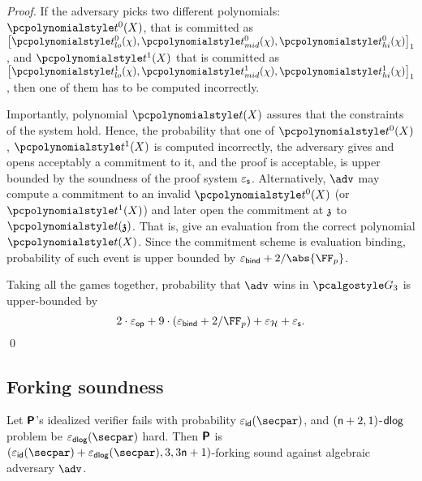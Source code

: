 \begin{proof}
  If the adversary picks two different polynomials: $\p{t^0}(X)$, that is committed
  as $\gone{\p{t^0_{lo}}(\chi), \p{t^0_{mid}}(\chi), \p{t^0_{hi}}(\chi)}$, and
  $\p{t^1}(X)$ that is committed as
  $\gone{\p{t^1_{lo}}(\chi), \p{t^1_{mid}}(\chi), \p{t^1_{hi}}(\chi)}$, then one of
  them has to be computed incorrectly. 

  Importantly, polynomial $\p{t}(X)$ assures that the constraints of the system
  hold. Hence, the probability that one of $\p{t^0}(X)$, $\p{t^1}(X)$ is computed
  incorrectly, the adversary gives and opens acceptably a commitment to it, and
  the proof is acceptable, is upper bounded by the soundness of the proof system
  $\varepsilon_{\mathsf{s}}$. Alternatively, $\adv$ may compute a commitment to an invalid
  $\p{t^0}(X)$ (or $\p{t^1}(X)$) and later open the commitment at $\mathfrak{z}$ to
  $\p{t}(\chz)$. That is, give an evaluation from the correct polynomial
  $\p{t}(X)$. Since the commitment scheme is evaluation binding, probability of
  such event is upper bounded by $\epsbinding + \infrac{2}{\abs{\FF_p}}$.

   Taking all the games together, probability that $\adv$ wins
  in $\game{3}$ is upper-bounded by
  \[
    2 \cdot \epsop + 9 \cdot (\epsbind + \infrac{2}{\FF_p}) + \epsro + \epss.
  \]
  \qed
\end{proof}

\subsection{Forking soundness}
\begin{lemma}
	\label{lem:plonkprot_ss}
	Let $\bm{\mathsf{P}}$'s idealized verifier fails with probability $\epsid (\secpar)$, and
	$(\mathsf{n} + 2, 1)$-$\mathsf{dlog}$ problem be $\epsdlog (\secpar)$ hard. Then $\bm{\mathsf{P}}$ is
	$(\epsid (\secpar) + \epsdlog (\secpar) , 3, 3 \noofc + 1)$-forking sound against algebraic
	adversary $\adv$.
\end{lemma}

